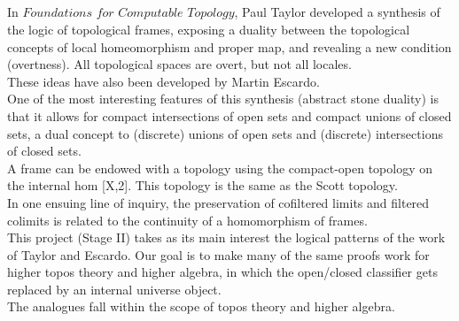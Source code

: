 \documentclass{book}
\newcounter{pcounter}
\newcounter{sectioncount}
\newcounter{subsectioncount}
\renewcommand{\section}[1]{\newpage\ \\ \ \\ \begin{center} \scalebox{1.5}{\texttt{\thesectioncount . #1}} \stepcounter{sectioncount} \setcounter{subsectioncount}{1} \end{center} \begin{center} \ \\ \ \\ \thispagestyle{empty} \end{center}}
\begin{document}
\section{\scalebox{0.6}{Stage II: Goals concerning geometric maps in topos theory and stable homotopy}}

In $\textit{Foundations for Computable Topology}$, Paul Taylor developed a synthesis of the logic of topological frames, exposing a duality between the topological concepts of local homeomorphism and proper map, and revealing a new condition (overtness). All topological spaces are overt, but not all locales.\\

These ideas have also been developed by Martin Escardo.\\

One of the most interesting features of this synthesis (abstract stone duality) is that it allows for compact intersections of open sets and compact unions of closed sets, a dual concept to (discrete) unions of open sets and (discrete) intersections of closed sets.\\

A frame can be endowed with a topology using the compact-open topology on the internal hom [X,2]. This topology is the same as the Scott topology.\\

In one ensuing line of inquiry, the preservation of cofiltered limits and filtered colimits is related to the continuity of a homomorphism of frames.\\

This project (Stage II) takes as its main interest the logical patterns of the work of Taylor and Escardo. Our goal is to make many of the same proofs work for higher topos theory and higher algebra, in which the open/closed classifier gets replaced by an internal universe object.\\ 

The analogues fall within the scope of topos theory and higher algebra.\\
\end{document}

